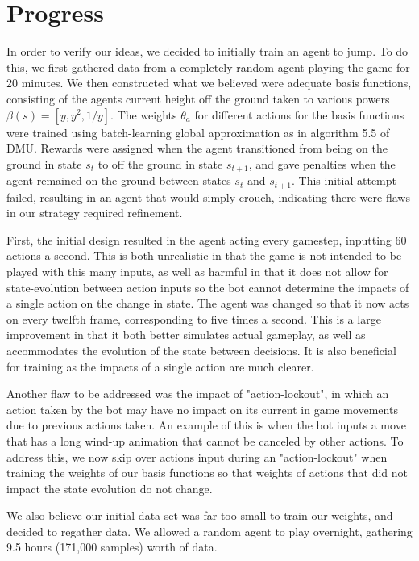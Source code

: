 \documentclass[11pt]{article}
\begin{document}
\section{Progress}
In order to verify our ideas, we decided to initially train an agent to jump. To do this, we first gathered data from a completely random agent playing the game for 20 minutes. We then constructed what we believed were adequate basis functions, consisting of the agents current height off the ground taken to various powers $\beta(s) = [y, y^2, 1/y]$. The weights $\theta_a$ for different actions for the basis functions were trained using batch-learning global approximation as in algorithm 5.5 of DMU\cite{DMU}. Rewards were assigned when the agent transitioned from being on the ground in state $s_t$ to off the ground in state $s_{t+1}$, and gave penalties when the agent remained on the ground between states $s_t$ and $s_{t+1}$. This initial attempt failed, resulting in an agent that would simply crouch, indicating there were flaws in our strategy required refinement.

First, the initial design resulted in the agent acting every gamestep, inputting 60 actions a second. This is both unrealistic in that the game is not intended to be played with this many inputs, as well as harmful in that it does not allow for state-evolution between action inputs so the bot cannot determine the impacts of a single action on the change in state. The agent was changed so that it now acts on every twelfth frame, corresponding to five times a second. This is a large improvement in that it both better simulates actual gameplay, as well as accommodates the evolution of the state between decisions. It is also beneficial for training as the impacts of a single action are much clearer.

Another flaw to be addressed was the impact of "action-lockout", in which an action taken by the bot may have no impact on its current in game movements due to previous actions taken. An example of this is when the bot inputs a move that has a long wind-up animation that cannot be canceled by other actions. To address this, we now skip over actions input during an "action-lockout" when training the weights of our basis functions so that weights of actions that did not impact the state evolution do not change.

We also believe our initial data set was far too small to train our weights, and decided to regather data. We allowed a random agent to play overnight, gathering 9.5 hours (171,000 samples) worth of data.
\end{document}
